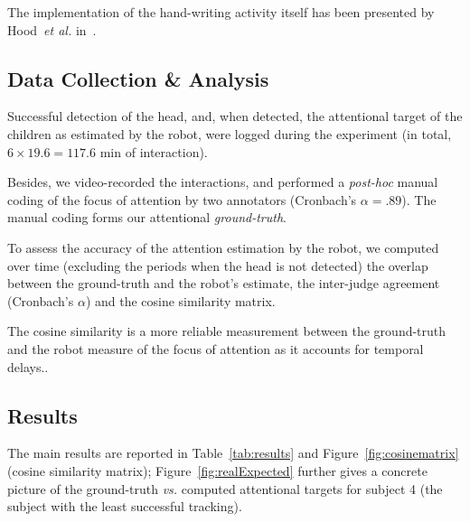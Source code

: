 \documentclass{sig-alternate}
\newcommand{\etal}{\textit{et al.}\xspace}
\newcommand{\vs}{\textit{vs.}\xspace}
\begin{document}
The implementation of the hand-writing activity itself has been presented by
Hood~\etal in~\cite{Hood:2015}.

\subsection{Data Collection \& Analysis}

Successful detection of the head, and, when detected, the attentional target of
the children as estimated by the robot, were logged during the experiment (in
total, $6\times19.6=117.6$ min of interaction).

Besides, we video-recorded the interactions, and performed a {\it post-hoc}
manual coding of the focus of attention by two annotators (Cronbach's
$\alpha=.89$).
The manual coding forms our attentional \emph{ground-truth}.

To assess the accuracy of the attention estimation by the robot, we computed
over time (excluding the periods when the head is not detected) the
overlap between the ground-truth and the robot's estimate, the
inter-judge agreement (Cronbach's $\alpha$) and the cosine similarity
matrix.

The cosine similarity is a more reliable measurement between the ground-truth
and the robot measure of the focus of attention as it accounts for temporal
delays..

\subsection{Results}

The main results are reported in Table~\ref{tab:results} and
Figure~\ref{fig:cosinematrix} (cosine similarity matrix);
Figure~\ref{fig:realExpected} further gives a concrete picture of the
ground-truth \vs computed attentional targets for subject 4 (the subject with
the least successful tracking).
\end{document}
